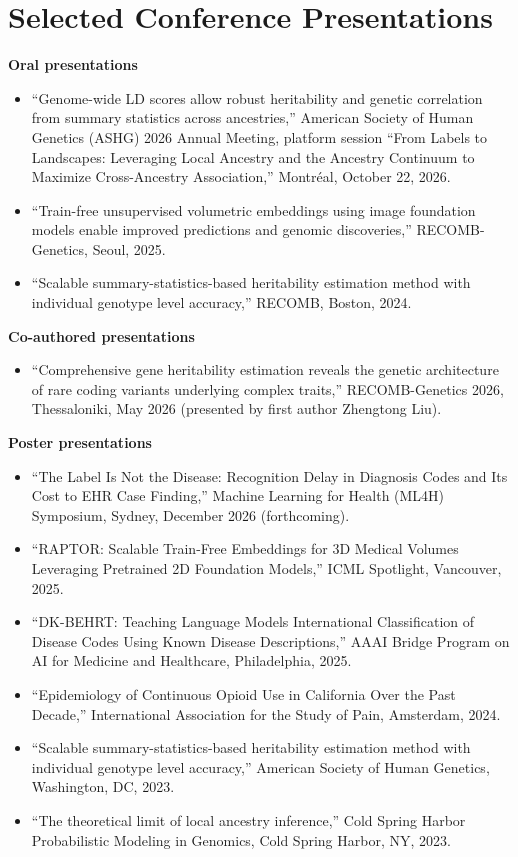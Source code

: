 \documentclass[10pt,letterpaper]{article}
\begin{document}
\section{Selected Conference Presentations}
\textbf{Oral presentations}
\begin{itemize}
\item ``Genome-wide LD scores allow robust heritability and genetic correlation from summary statistics across ancestries,'' American Society of Human Genetics (ASHG) 2026 Annual Meeting, platform session ``From Labels to Landscapes: Leveraging Local Ancestry and the Ancestry Continuum to Maximize Cross-Ancestry Association,'' Montr\'eal, October 22, 2026.
\item ``Train-free unsupervised volumetric embeddings using image foundation models enable improved predictions and genomic discoveries,'' RECOMB-Genetics, Seoul, 2025.
\item ``Scalable summary-statistics-based heritability estimation method with individual genotype level accuracy,'' RECOMB, Boston, 2024.
\end{itemize}
\textbf{Co-authored presentations}
\begin{itemize}
\item ``Comprehensive gene heritability estimation reveals the genetic architecture of rare coding variants underlying complex traits,'' RECOMB-Genetics 2026, Thessaloniki, May 2026 (presented by first author Zhengtong Liu).
\end{itemize}
\textbf{Poster presentations}
\begin{itemize}
\item ``The Label Is Not the Disease: Recognition Delay in Diagnosis Codes and Its Cost to EHR Case Finding,'' Machine Learning for Health (ML4H) Symposium, Sydney, December 2026 (forthcoming).
\item ``RAPTOR: Scalable Train-Free Embeddings for 3D Medical Volumes Leveraging Pretrained 2D Foundation Models,'' ICML Spotlight, Vancouver, 2025.
\item ``DK-BEHRT: Teaching Language Models International Classification of Disease Codes Using Known Disease Descriptions,'' AAAI Bridge Program on AI for Medicine and Healthcare, Philadelphia, 2025.
\item ``Epidemiology of Continuous Opioid Use in California Over the Past Decade,'' International Association for the Study of Pain, Amsterdam, 2024.
\item ``Scalable summary-statistics-based heritability estimation method with individual genotype level accuracy,'' American Society of Human Genetics, Washington, DC, 2023.
\item ``The theoretical limit of local ancestry inference,'' Cold Spring Harbor Probabilistic Modeling in Genomics, Cold Spring Harbor, NY, 2023.
\end{itemize}
\end{document}

